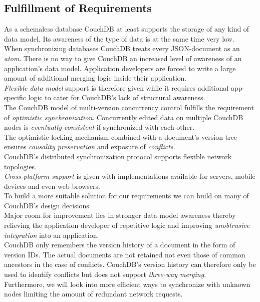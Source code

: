 \subsection{Fulfillment of Requirements}
As a schemaless database CouchDB at least supports the storage of any kind of data model.
Its awareness of the type of data is at the same time very low.\\
When synchronizing databases CouchDB treats every JSON-document as an \emph{atom}.
There is no way to give CouchDB an increased level of awareness of an application's data model.
Application developers are forced to write a large amount of additional merging logic inside their application.\\
\emph{Flexible data model} support is therefore given while it requires additional app-specific logic to cater for CouchDB's lack of structural awareness.\\
The CouchDB model of multi-version concurrency control fulfills the requirement of \emph{optimistic synchronization}.
Concurrently edited data on multiple CouchDB nodes is \emph{eventually consistent} if synchronized with each other.\\
The optimistic locking mechanism combined with a document's version tree ensures \emph{causality preservation} and exposure of \emph{conflicts}.\\
CouchDB's distributed synchronization protocol supports {flexible network topologies}.\\
\emph{Cross-platform support} is given with implementations available for servers, mobile devices and even web browsers.\\

To build a more suitable solution for our requirements we can build on many of CouchDB's design decisions.\\
Major room for improvement lies in stronger data model awareness thereby relieving the application developer of repetitive logic and improving \emph{unobtrusive integration} into an application.\\
CouchDB only remembers the version history of a document in the form of version IDs.
The actual documents are not retained not even those of common ancestors in the case of conflicts.
CouchDB's version history can therefore only be used to identify conflicts but does not support \emph{three-way merging}.\\
Furthermore, we will look into more efficient ways to synchronize with unknown nodes limiting the amount of redundant network requests.
